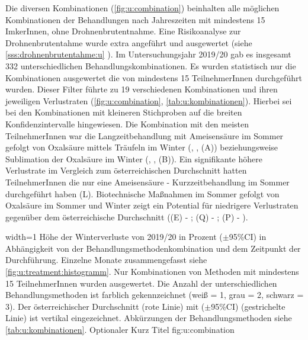 \label{sss:kombination:U}

Die diversen Kombinationen (\cref{fig:u:combination}) beinhalten alle möglichen Kombinationen der Behandlungen nach Jahreszeiten mit mindestens 15 ImkerInnen, ohne Drohnenbrutentnahme. Eine Risikoanalyse zur Drohnenbrutentahme wurde extra angeführt und ausgewertet (siehe \ref{sss:drohnenbrutentahme:u} ). Im Untersuchungsjahr 2019/20 gab es insgesamt 332 unterschiedlichen Behandlungskombinationen. Es wurden statistisch nur die Kombinationen ausgewertet die von mindestens 15 TeilnehmerInnen durchgeführt wurden. Dieser Filter führte zu 19 verschiedenen Kombinationen und ihren jeweiligen Verlustraten (\cref{fig:u:combination}, \cref{tab:u:kombinationen}). Hierbei sei bei den Kombinationen mit kleineren Stichproben auf die breiten Konfidenzintervalle hingewiesen.
\newline
Die Kombination mit den meisten TeilnehmerInnen war die Langzeitbehandlung mit Ameisensäure im Sommer gefolgt von Oxalsäure mittels Träufeln im Winter (, , (A)) beziehungsweise Sublimation der Oxalsäure im Winter (, , (B)). Ein signifikante höhere Verlustrate im Vergleich zum österreichischen Durchschnitt hatten TeilnehmerInnen die nur eine Ameisensäure - Kurzzeitbehandlung im Sommer durchgeführt haben  (L). 
\newline
Biotechnische Maßnahmen im Sommer gefolgt von Oxalsäure im Sommer und Winter zeigt ein Potential für niedrigere Verlustraten gegenüber dem österreichische Durchschnitt ((E) - ; (Q) - ; (P) - ).

{width=1\textwidth} %
{Höhe der Winterverluste von 2019/20 in Prozent ($\pm$95\%CI) in Abhängigkeit von der Behandlungsmethodenkombination und dem Zeitpunkt der Durchführung. Einzelne Monate zusammengefasst siehe \cref{fig:u:treatment:histogramm}. Nur Kombinationen von Methoden mit mindestens 15 TeilnehmerInnen wurden ausgewertet. Die Anzahl der unterschiedlichen Behandlungsmethoden ist farblich gekennzeichnet (weiß = 1, grau = 2, schwarz = 3). Der österreichischer Durchschnitt (rote Linie) mit ($\pm$95\%CI) (gestrichelte Linie) ist vertikal eingezeichnet. Abkürzungen der Behandlungsmethoden siehe \cref{tab:u:kombinationen}.} %
{Optionaler Kurz Titel} %
{fig:u:combination} %

